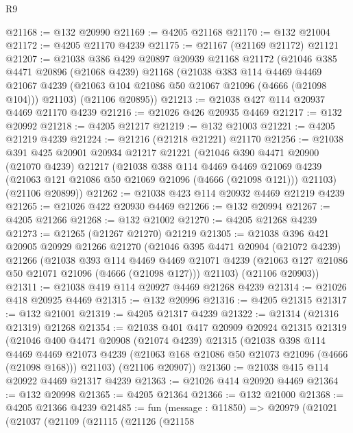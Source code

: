 \begin{lexlean}{R9}
\begin{coremodule}
@21168 := @132 @20990
@21169 := @4205 @21168
@21170 := @132 @21004
@21172 := @4205 @21170 @4239
@21175 := @21167 (@21169 @21172) @21121
@21207 := @21038
    @386
    @429
    @20897
    @20939
    @21168
    @21172
    (@21046
      @385
      @4471
      @20896
      (@21068 @4239)
      @21168
      (@21038
        @383
        @114
        @4469
        @4469
        @21067
        @4239
        (@21063 @104 @21086 @50 @21067 @21096 (@4666 (@21098 @104)))
        @21103)
      (@21106 @20895))
@21213 := @21038 @427 @114 @20937 @4469 @21170 @4239
@21216 := @21026 @426 @20935 @4469
@21217 := @132 @20992
@21218 := @4205 @21217
@21219 := @132 @21003
@21221 := @4205 @21219 @4239
@21224 := @21216 (@21218 @21221) @21170
@21256 := @21038
    @391
    @425
    @20901
    @20934
    @21217
    @21221
    (@21046
      @390
      @4471
      @20900
      (@21070 @4239)
      @21217
      (@21038
        @388
        @114
        @4469
        @4469
        @21069
        @4239
        (@21063 @121 @21086 @50 @21069 @21096 (@4666 (@21098 @121)))
        @21103)
      (@21106 @20899))
@21262 := @21038 @423 @114 @20932 @4469 @21219 @4239
@21265 := @21026 @422 @20930 @4469
@21266 := @132 @20994
@21267 := @4205 @21266
@21268 := @132 @21002
@21270 := @4205 @21268 @4239
@21273 := @21265 (@21267 @21270) @21219
@21305 := @21038
    @396
    @421
    @20905
    @20929
    @21266
    @21270
    (@21046
      @395
      @4471
      @20904
      (@21072 @4239)
      @21266
      (@21038
        @393
        @114
        @4469
        @4469
        @21071
        @4239
        (@21063 @127 @21086 @50 @21071 @21096 (@4666 (@21098 @127)))
        @21103)
      (@21106 @20903))
@21311 := @21038 @419 @114 @20927 @4469 @21268 @4239
@21314 := @21026 @418 @20925 @4469
@21315 := @132 @20996
@21316 := @4205 @21315
@21317 := @132 @21001
@21319 := @4205 @21317 @4239
@21322 := @21314 (@21316 @21319) @21268
@21354 := @21038
    @401
    @417
    @20909
    @20924
    @21315
    @21319
    (@21046
      @400
      @4471
      @20908
      (@21074 @4239)
      @21315
      (@21038
        @398
        @114
        @4469
        @4469
        @21073
        @4239
        (@21063 @168 @21086 @50 @21073 @21096 (@4666 (@21098 @168)))
        @21103)
      (@21106 @20907))
@21360 := @21038 @415 @114 @20922 @4469 @21317 @4239
@21363 := @21026 @414 @20920 @4469
@21364 := @132 @20998
@21365 := @4205 @21364
@21366 := @132 @21000
@21368 := @4205 @21366 @4239
@21485 := fun (message : @11850) =>
  @20979
    (@21021
      (@21037
        (@21109
          (@21115
            (@21126
              (@21158

\end{coremodule}
\end{lexlean}
